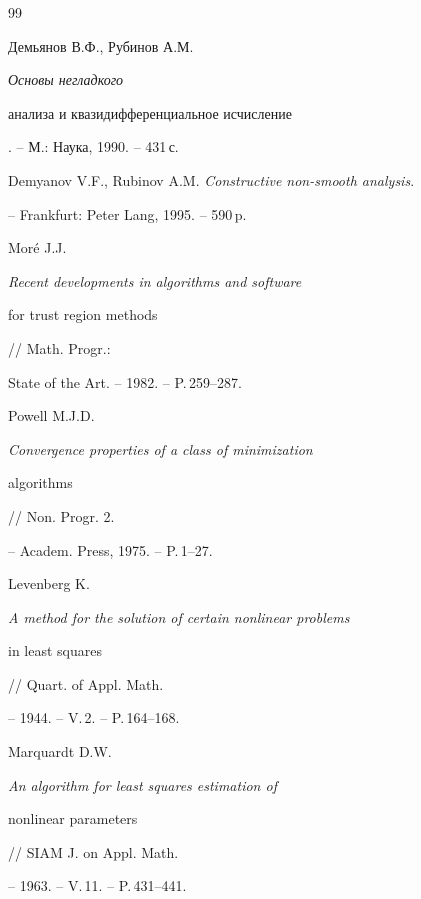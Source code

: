 \begin{thebibliography}{99}







Демьянов В.Ф., Рубинов А.М. {\em Основы негладкого  


анализа и квазидифференциальное исчисление}. -- М.: Наука, 1990. -- 431\,с.







Demyanov V.F., Rubinov A.M.  {\em Constructive non-smooth analysis}.


-- Frankfurt: Peter Lang, 1995. -- 590\,p.







Mor\'e J.J. {\em Recent developments in algorithms and software


for trust region methods} // Math. Progr.:


State of the Art. -- 1982. -- P.\,259--287.







Powell M.J.D.  {\em Convergence properties of a class of minimization


algorithms} // Non. Progr. 2.




-- Academ. Press, 1975. -- P.\,1--27.







Levenberg K. {\em A method for the solution of certain nonlinear problems


in least squares} // Quart. of Appl. Math.


-- 1944. --  V.\,2. -- P.\,164--168.







Marquardt D.W.  {\em An algorithm for least squares estimation of


nonlinear parameters} // SIAM J. on Appl. Math.


-- 1963. -- V.\,11. -- P.\,431--441.






\end{thebibliography}
